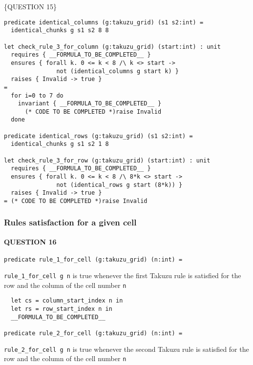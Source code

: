 \{QUESTION 15\}

\begin{verbatim}
predicate identical_columns (g:takuzu_grid) (s1 s2:int) =
  identical_chunks g s1 s2 8 8

let check_rule_3_for_column (g:takuzu_grid) (start:int) : unit
  requires { __FORMULA_TO_BE_COMPLETED__ }
  ensures { forall k. 0 <= k < 8 /\ k <> start ->
               not (identical_columns g start k) }
  raises { Invalid -> true }
=
  for i=0 to 7 do
    invariant { __FORMULA_TO_BE_COMPLETED__ }
      (* CODE TO BE COMPLETED *)raise Invalid
  done

predicate identical_rows (g:takuzu_grid) (s1 s2:int) =
  identical_chunks g s1 s2 1 8

let check_rule_3_for_row (g:takuzu_grid) (start:int) : unit
  requires { __FORMULA_TO_BE_COMPLETED__ }
  ensures { forall k. 0 <= k < 8 /\ 8*k <> start ->
               not (identical_rows g start (8*k)) }
  raises { Invalid -> true }
= (* CODE TO BE COMPLETED *)raise Invalid
\end{verbatim}

\hypertarget{rules-satisfaction-for-a-given-cell}{%
\subsubsection{Rules satisfaction for a given
cell}\label{rules-satisfaction-for-a-given-cell}}

\hypertarget{question-16}{%
\paragraph{QUESTION 16}\label{question-16}}

\begin{verbatim}
predicate rule_1_for_cell (g:takuzu_grid) (n:int) =
\end{verbatim}

\texttt{rule\_1\_for\_cell\ g\ n} is true whenever the first Takuzu rule
is satisfied for the row and the column of the cell number \texttt{n}

\begin{verbatim}
  let cs = column_start_index n in
  let rs = row_start_index n in
  __FORMULA_TO_BE_COMPLETED__

predicate rule_2_for_cell (g:takuzu_grid) (n:int) =
\end{verbatim}

\texttt{rule\_2\_for\_cell\ g\ n} is true whenever the second Takuzu
rule is satisfied for the row and the column of the cell number
\texttt{n}

